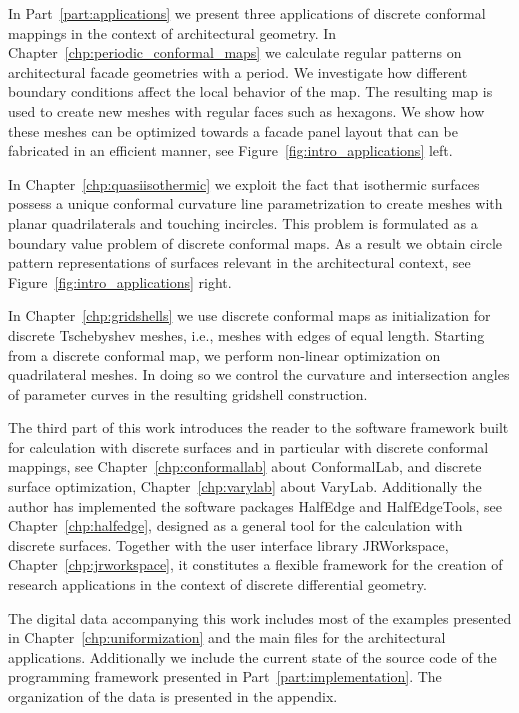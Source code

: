 \documentclass[Thesis.tex]{subfiles}
\begin{document}
In Part~\ref{part:applications} we present three applications of discrete conformal mappings in the context of architectural geometry. 
In Chapter~\ref{chp:periodic_conformal_maps} we calculate regular patterns on architectural facade geometries with a period. 
We investigate how different boundary conditions affect the local behavior of the map.
The resulting map is used to create new meshes with regular faces such as hexagons.
We show how these meshes can be optimized towards a facade panel layout that can be fabricated in an efficient manner, see Figure~\ref{fig:intro_applications} left.

In Chapter~\ref{chp:quasiisothermic} we exploit the fact that isothermic surfaces possess a unique conformal curvature line parametrization to create meshes with planar quadrilaterals and touching incircles. 
This problem is formulated as a boundary value problem of discrete conformal maps.
As a result we obtain circle pattern representations of surfaces relevant in the architectural context, see Figure~\ref{fig:intro_applications} right.

In Chapter~\ref{chp:gridshells} we use discrete conformal maps as initialization for discrete Tschebyshev meshes, i.e., meshes with  edges of equal length. 
Starting from a discrete conformal map, we perform non-linear optimization on quadrilateral meshes.
In doing so we control the curvature and intersection angles of parameter curves in the resulting gridshell construction.

The third part of this work introduces the reader to the software framework built for calculation with discrete surfaces and in particular with discrete conformal mappings, see Chapter~\ref{chp:conformallab}  about {\sc ConformalLab}, and discrete surface optimization, Chapter~\ref{chp:varylab} about {\sc VaryLab}. 
Additionally the author has implemented the software packages {\sc HalfEdge} and {\sc HalfEdgeTools}, see Chapter~\ref{chp:halfedge}, designed as a general tool for the calculation with discrete surfaces. 
Together with the user interface library {\sc JRWorkspace}, Chapter~\ref{chp:jrworkspace}, it constitutes a flexible framework for the creation of research applications in the context of discrete differential geometry. 

The digital data accompanying this work includes most of the examples presented in Chapter~\ref{chp:uniformization} and the main files for the architectural applications. 
Additionally we include the current state of the source code of the programming framework presented in Part~\ref{part:implementation}. 
The organization of the data is presented in the appendix.
\end{document}
